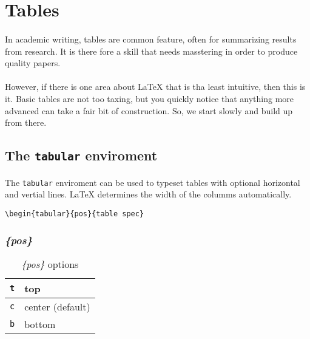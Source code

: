 

\section{Tables}

\paragraph{}
In academic writing, tables are common feature, often for summarizing
results from research. It is there fore a skill that needs masstering
in order to produce quality papers.

\paragraph{}
However, if there is one area about \LaTeX{} that is tha least intuitive,
then this is it. Basic tables are not too taxing, but you quickly notice
that anything more advanced can take a fair bit of construction. So, we
start slowly and build up from there.

\subsection[\texttt{tabular}]{The \texttt{tabular} enviroment}

\paragraph{}
The \texttt{tabular} enviroment can be used to typeset tables with optional
 horizontal and vertial lines. \LaTeX{} determines
the width of the columms  automatically.

\begin{verbatim}
\begin{tabular}{pos}{table spec}
\end{verbatim}

\subsubsection{\emph{\{pos\}}}
\begin{table}[htbp]
	\centering
\begin{center}
	\begin{tabular}{| c | p{3cm} |}
		\hline
		\texttt{t} & top \\ \hline
		\texttt{c} & center (default) \\ \hline
		\texttt{b} & bottom \\ \hline
	\end{tabular}
\end{center}
	\caption{\emph{\{pos\}} options}
	\label{tabular_positions}
\end{table}


